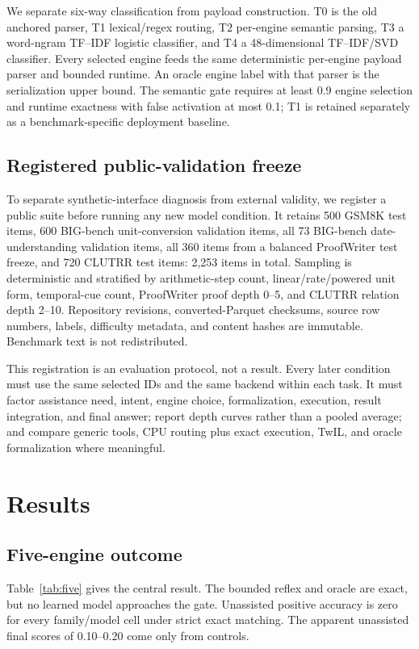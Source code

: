 \documentclass[10pt]{article}
\begin{document}
We separate six-way classification from payload construction.  T0 is the old
anchored parser, T1 lexical/regex routing, T2 per-engine semantic parsing, T3 a
word-ngram TF--IDF logistic classifier, and T4 a 48-dimensional TF--IDF/SVD
classifier.  Every selected engine feeds the same deterministic per-engine
payload parser and bounded runtime.  An oracle engine label with that parser is
the serialization upper bound.  The semantic gate requires at least 0.9 engine
selection and runtime exactness with false activation at most 0.1; T1 is retained
separately as a benchmark-specific deployment baseline.

\subsection{Registered public-validation freeze}

To separate synthetic-interface diagnosis from external validity, we register a
public suite before running any new model condition.  It retains 500 GSM8K test
items, 600 BIG-bench unit-conversion validation items, all 73 BIG-bench
date-understanding validation items, all 360 items from a balanced ProofWriter
test freeze, and 720 CLUTRR test items: 2,253 items in total.  Sampling is
deterministic and stratified by arithmetic-step count, linear/rate/powered unit
form, temporal-cue count, ProofWriter proof depth 0--5, and CLUTRR relation depth
2--10.  Repository revisions, converted-Parquet checksums, source row numbers,
labels, difficulty metadata, and content hashes are immutable.  Benchmark text
is not redistributed.

This registration is an evaluation protocol, not a result.  Every later
condition must use the same selected IDs and the same backend within each task.
It must factor assistance need, intent, engine choice, formalization, execution,
result integration, and final answer; report depth curves rather than a pooled
average; and compare generic tools, CPU routing plus exact execution, TwIL, and
oracle formalization where meaningful.

\section{Results}

\subsection{Five-engine outcome}

Table~\ref{tab:five} gives the central result.  The bounded reflex and oracle are
exact, but no learned model approaches the gate.  Unassisted positive accuracy
is zero for every family/model cell under strict exact matching.  The apparent
unassisted final scores of 0.10--0.20 come only from controls.
\end{document}
